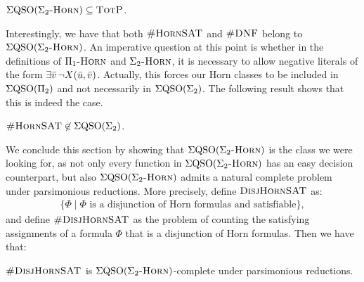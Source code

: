 \begin{proposition}\label{prop:ehorn-pe}
$\Sigma{\rm QSO}(\Sigma_2\textsc{-Horn}) \subseteq \text{\sc TotP}$.
\end{proposition}
Interestingly, we have that both $\textsc{\#HornSAT}$ and $\textsc{\#DNF}$ belong to $\Sigma{\rm QSO}(\Sigma_2\textsc{-Horn})$. 
An imperative question at this point is whether in the definitions of $\Pi_1\textsc{-Horn}$ and $\Sigma_2\textsc{-Horn}$, it is necessary to allow negative literals of the form $\exists \bar{v} \, \neg X(\bar{u},\bar{v})$. Actually, this forces our Horn classes to be included in $\Sigma{\rm QSO}(\Pi_{2})$ and not necessarily in $\Sigma{\rm QSO}(\Sigma_{2})$. The following result shows that this is indeed the case.

\begin{proposition}\label{prop:hsat-not-sigma2}	
$\textsc{\#HornSAT} \not\in \Sigma{\rm QSO}(\Sigma_{2})$.
\end{proposition}
We conclude this section by showing that $\Sigma{\rm QSO}(\Sigma_2\textsc{-Horn})$ is the class we were looking for, as not only every function in $\Sigma{\rm QSO}(\Sigma_2\textsc{-Horn})$ has an easy decision counterpart, but also $\Sigma{\rm QSO}(\Sigma_2\textsc{-Horn})$ admits a natural complete problem under parsimonious reductions. More precisely, define $\textsc{DisjHornSAT}$ as:
\begin{multline*}
\{\Phi \mid \Phi \text{ is a disjunction of Horn formulas and satisfiable}\},
\end{multline*}
and define $\textsc{\#DisjHornSAT}$ as the problem of counting the satisfying assignments of a formula $\Phi$ that is a disjunction of Horn formulas. Then we have that:

\begin{theorem} \label{sigma2hard}
	$\textsc{\#DisjHornSAT}$ is $\Sigma{\rm QSO}(\Sigma_2\textsc{-Horn})$-complete under parsimonious reductions. 
\end{theorem}